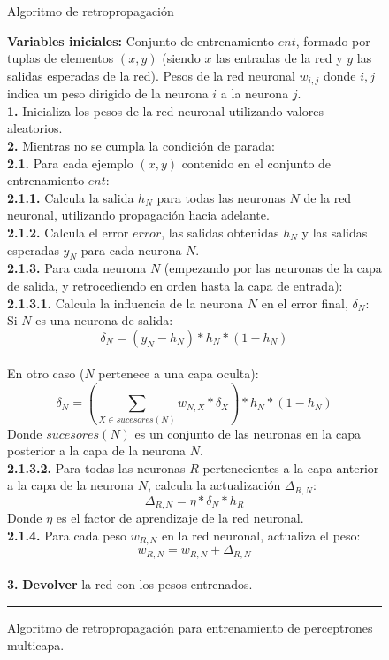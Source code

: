 \begin{figure}
\begin{algorithm}[H]
\caption{Algoritmo de retropropagación}
\textbf{Variables iniciales:} Conjunto de entrenamiento $ent$, formado por tuplas de elementos $(x, y)$ (siendo $x$ las entradas de la red y $y$ las salidas esperadas de la red). Pesos de la red neuronal $w_{i,j}$ donde $i,j$ indica un peso dirigido de la neurona $i$ a la neurona $j$.\\
\textbf{1.} Inicializa los pesos de la red neuronal utilizando valores aleatorios.\\
\textbf{2.} Mientras no se cumpla la condición de parada:\\
\Indp \textbf{2.1.} Para cada ejemplo $(x, y)$ contenido en el conjunto de entrenamiento $ent$:\\
\Indp \textbf{2.1.1.} Calcula la salida $h_N$ para todas las neuronas $N$ de la red neuronal, utilizando propagación hacia adelante.\\
\textbf{2.1.2.} Calcula el error $error$, las salidas obtenidas $h_N$ y las salidas esperadas $y_N$ para cada neurona $N$.\\
\textbf{2.1.3.} Para cada neurona $N$ (empezando por las neuronas de la capa de salida, y retrocediendo en orden hasta la capa de entrada):\\
\Indp \textbf{2.1.3.1.} Calcula la influencia de la neurona $N$ en el error final, $\delta_N$:\\
Si $N$ es una neurona de salida:
\[\delta_N = (y_N - h_N) * h_N * (1-h_N)\]\\
En otro caso ($N$ pertenece a una capa oculta):
\[\delta_N = \left(\sum_{X \in sucesores(N)} w_{N,X} * \delta_X \right) * h_N *(1-h_N)\]
Donde $sucesores(N)$ es un conjunto de las neuronas en la capa posterior a la capa de la neurona $N$.\\
\textbf{2.1.3.2.} Para todas las neuronas $R$ pertenecientes a la capa anterior a la capa de la neurona $N$, calcula la actualización $\Delta_{R,N}$:
\[\Delta_{R,N} = \eta * \delta_N * h_R\]
Donde $\eta$ es el factor de aprendizaje de la red neuronal.\\
\Indm \textbf{2.1.4.} Para cada peso $w_{R,N}$ en la red neuronal, actualiza el peso:
\[w_{R,N} = w_{R,N} + \Delta_{R,N}\]\\
\Indm \Indm \textbf{3.} \textbf{Devolver} la red con los pesos entrenados.
\end{algorithm}
\hrule
\caption{Algoritmo de retropropagación para entrenamiento de perceptrones multicapa.}
\label{alg:chap3-back}
\end{figure}

